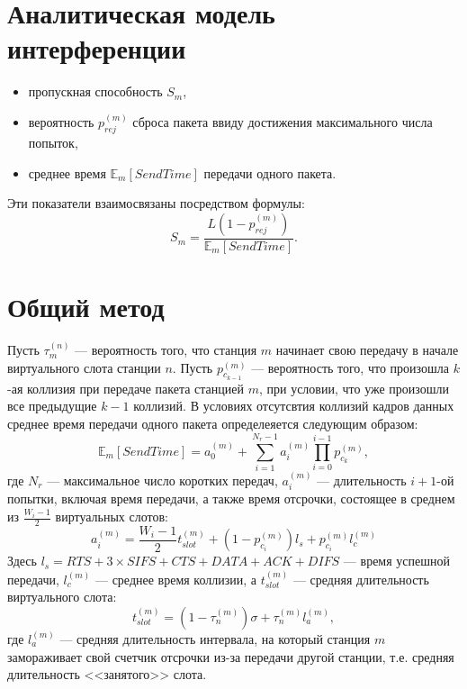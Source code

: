 {
\newcommand{\prej}[1]{p_{rej}^{(#1)}}
\newcommand{\Est}[1]{\mathbb{E}_{#1}[SendTime]}
\newcommand{\tst}[2]{\tau_{#1}^{(#2)}}
\newcommand{\pc}[2]{p_{c_{#1}}^{(#2)}}
\newcommand{\at}[2]{a_{#1}^{(#2)}}
\newcommand{\lc}[1]{l_{c}^{(#1)}}
\newcommand{\ls}[1]{l_{s}^{(#1)}}
\newcommand{\la}[1]{l_{a}^{(#1)}}
\newcommand{\tslot}[1]{t_{slot}^{(#1)}}

\section{Аналитическая модель интерференции}
\begin{itemize}
\item пропускная способность $S_m$,
\item вероятность $\prej{m}$ сброса пакета ввиду достижения максимального числа попыток,
\item среднее время $\Est{m}$ передачи одного пакета.
\end{itemize}
Эти показатели взаимосвязаны посредством формулы:
\begin{equation}
S_m = \frac{L(1-\prej{m})}{\Est{m}}.
\end{equation}

\section{Общий метод}
Пусть $\tst{m}{n}$ --- вероятность того, что станция $m$ начинает свою передачу в начале виртуального слота станции $n$. Пусть $\pc{k-1}{m}$ --- вероятность того, что произошла $k$-ая коллизия при передаче пакета станцией $m$, при условии, что уже произошли все предыдущие $k-1$ коллизий. В условиях отсутсвтия коллизий кадров данных среднее время передачи одного пакета определеяется следующим образом:
\begin{equation}
\Est{m} = \at{0}{m} + \sum\limits_{i = 1}^{N_r - 1} \at{i}{m}
				\prod\limits_{i=0}^{i-1}\pc{k}{m},
\end{equation} 
где $N_r$ --- максимальное число коротких передач, $\at{i}{m}$ --- длительность $i+1$-ой попытки, включая время передачи, а также время отсрочки, состоящее в среднем из $\frac{W_i-1}{2}$ виртуальных слотов:
\begin{equation}
\at{i}{m} = \frac{W_i-1}{2}\tslot{m} + (1-\pc{i}{m})l_s + \pc{i}{m} \lc{m}
\end{equation}
Здесь  $l_s = RTS + 3\times SIFS + CTS + DATA + ACK + DIFS$ --- время успешной передачи, $\lc{m}$ --- среднее время коллизии, а $\tslot{m}$ --- средняя длительность виртуального слота:
\begin{equation}
\tslot{m} = (1 - \tst{n}{m})\sigma  + \tst{n}{m}\la{m},
\end{equation}
где $\la{m}$ --- средняя длительность интервала, на который станция $m$ замораживает свой счетчик отсрочки из-за передачи другой станции, т.е. средняя длительность <<занятого>> слота.

}
